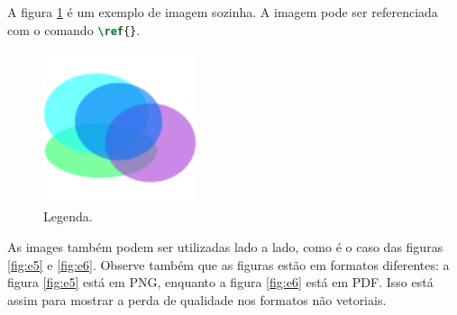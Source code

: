     A figura \ref{fig:e4} é um exemplo de imagem sozinha.
    A imagem pode ser referenciada com o comando \lstinline[language=TeX, style=Code]|\ref{}|.


    \begin{figure}[htb]
    \centering
        \includegraphics[width=0.4\textwidth]{images/figure.png}
        \caption{Legenda.}
        \label{fig:e4}
    \end{figure}

    As images também podem ser utilizadas lado a lado, como é o caso das figuras \ref{fig:e5} e \ref{fig:e6}.
    Observe também que as figuras estão em formatos diferentes: a figura \ref{fig:e5} está em PNG, enquanto a figura \ref{fig:e6} está em PDF.
    Isso está assim para mostrar a perda de qualidade nos formatos não vetoriais.


